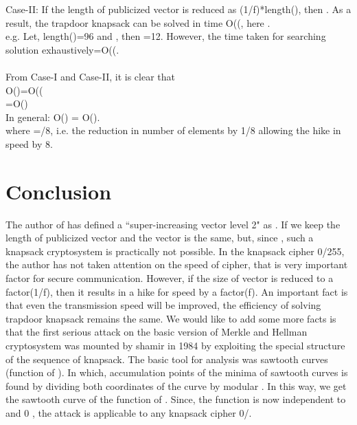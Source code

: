 \documentclass[5p,times,twocolumn]{elsarticle}
\begin{document}
Case-II: If the length of publicized vector  is reduced as (1/f)*length(), then . As a result, the trapdoor knapsack  can be solved in time O((, here .\\
e.g. Let, length()=96 and , then =12. However, the time taken for searching solution exhaustively=O((.\\\\   
From Case-I and Case-II, it is clear that\\ 
\indent O()=O((\\
\indent\hspace{10 mm}=O()\\
In general:
O() = O().\\ where =/8,  i.e. the reduction in number of elements by 1/8 allowing the hike in speed by 8.


\section{Conclusion}
\label{sec:4}
The author of \cite{pham2011improvement} has defined a ``super-increasing vector level 2" as . If we keep the length of publicized vector  and the vector  is the same, but, since , such a knapsack cryptosystem is practically not possible. In the knapsack cipher 0/255,  the author has not taken attention on the speed of cipher, that is very important factor for secure communication. However, if the size of vector  is reduced to a factor(1/f), then it results in a hike for speed by a factor(f). An important fact is that even the transmission speed will be improved, the efficiency of solving trapdoor knapsack remains the same. We would like to add some more facts is that the first serious attack on the basic version of Merkle and Hellman cryptosystem was mounted by shamir in 1984 \cite{shamir1984polynomial} by exploiting the special structure of the sequence of knapsack. The basic tool for analysis was sawtooth curves (function of ). In which, accumulation points of the minima of  sawtooth curves is found by dividing both coordinates of the curve by modular . In this way, we get the sawtooth curve of the function of . Since, the function is now independent to  and 0 , the attack is applicable to any knapsack cipher 0/.




\end{document}
